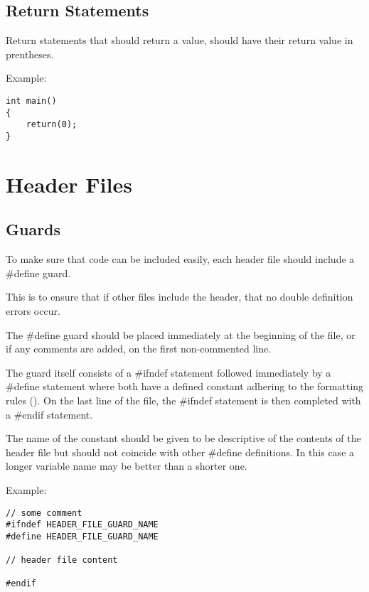 \documentclass[12pt,article]{memoir}
\begin{document}
\subsection{Return Statements}
Return statements that should return a value, should have their return value in prentheses.\par
Example:
\begin{lstlisting}
int main()
{
	return(0);
}
\end{lstlisting}

\newpage
\section{Header Files}
\subsection{Guards}
To make sure that code can be included easily, each header file should include a \#define guard.\par
This is to ensure that if other files include the header, that no double definition errors occur.\par
The \#define guard should be placed immediately at the beginning of the file, or if any comments are added, on the first non-commented line.\par
The guard itself consists of a \#ifndef statement followed immediately by a \#define statement where both have a defined constant adhering to the formatting rules (). On the last line of the file, the \#ifndef statement is then completed with a \#endif statement.\par
The name of the constant should be given to be descriptive of the contents of the header file but should not coincide with other \#define definitions. In this case a longer variable name may be better than a shorter one.\par
Example:
\begin{lstlisting}
// some comment
#ifndef HEADER_FILE_GUARD_NAME
#define HEADER_FILE_GUARD_NAME

// header file content

#endif
\end{lstlisting}

\newpage
\end{document}
